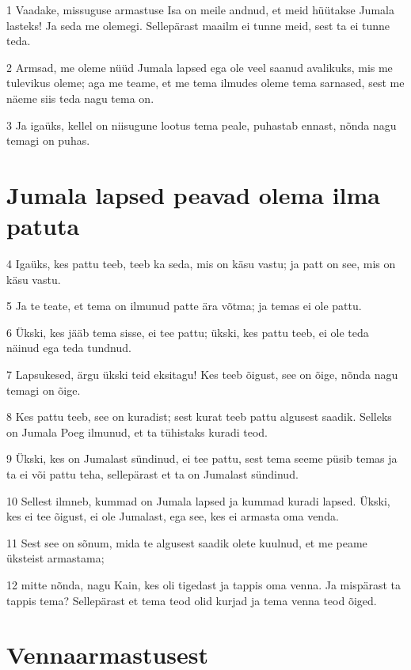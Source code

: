 \par 1 Vaadake, missuguse armastuse Isa on meile andnud, et meid hüütakse Jumala lasteks! Ja seda me olemegi. Sellepärast maailm ei tunne meid, sest ta ei tunne teda.
\par 2 Armsad, me oleme nüüd Jumala lapsed ega ole veel saanud avalikuks, mis me tulevikus oleme; aga me teame, et me tema ilmudes oleme tema sarnased, sest me näeme siis teda nagu tema on.
\par 3 Ja igaüks, kellel on niisugune lootus tema peale, puhastab ennast, nõnda nagu temagi on puhas.

\section*{Jumala lapsed peavad olema ilma patuta}

\par 4 Igaüks, kes pattu teeb, teeb ka seda, mis on käsu vastu; ja patt on see, mis on käsu vastu.
\par 5 Ja te teate, et tema on ilmunud patte ära võtma; ja temas ei ole pattu.
\par 6 Ükski, kes jääb tema sisse, ei tee pattu; ükski, kes pattu teeb, ei ole teda näinud ega teda tundnud.
\par 7 Lapsukesed, ärgu ükski teid eksitagu! Kes teeb õigust, see on õige, nõnda nagu temagi on õige.
\par 8 Kes pattu teeb, see on kuradist; sest kurat teeb pattu algusest saadik. Selleks on Jumala Poeg ilmunud, et ta tühistaks kuradi teod.
\par 9 Ükski, kes on Jumalast sündinud, ei tee pattu, sest tema seeme püsib temas ja ta ei või pattu teha, sellepärast et ta on Jumalast sündinud.
\par 10 Sellest ilmneb, kummad on Jumala lapsed ja kummad kuradi lapsed. Ükski, kes ei tee õigust, ei ole Jumalast, ega see, kes ei armasta oma venda.
\par 11 Sest see on sõnum, mida te algusest saadik olete kuulnud, et me peame üksteist armastama;
\par 12 mitte nõnda, nagu Kain, kes oli tigedast ja tappis oma venna. Ja mispärast ta tappis tema? Sellepärast et tema teod olid kurjad ja tema venna teod õiged.

\section*{Vennaarmastusest}

